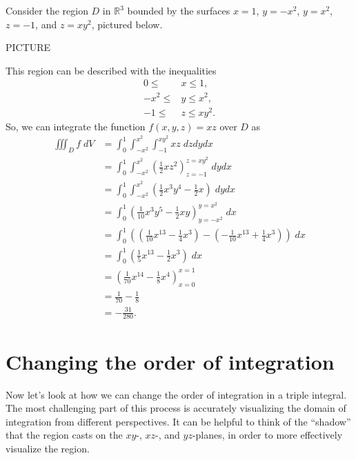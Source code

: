 \documentclass{ximera}
\begin{document}
\begin{example}
Consider the region $D$ in $\mathbb{R}^3$ bounded by the surfaces $x=1$, $y=-x^2$, $y=x^2$, $z = -1$, and $z=xy^2$, pictured below.

PICTURE

This region can be described with the inequalities
\begin{align*}
0\leq &x\leq 1,\\
-x^2\leq &y\leq x^2,\\
-1\leq &z\leq xy^2.
\end{align*}
So, we can integrate the function $f(x,y,z) = xz$ over $D$ as
\begin{align*}
\iiint_D f\;dV &= \int_0^1\int_{-x^2}^{x^2}\int_{-1}^{xy^2} xz\;dzdydx\\
&= \int_0^1\int_{-x^2}^{x^2}\left(\frac{1}{2}xz^2\right)_{z = -1}^{z = xy^2}\;dydx\\
&= \int_0^1\int_{-x^2}^{x^2}\left(\frac{1}{2}x^3y^4-\frac{1}{2}x\right)\;dydx\\
&= \int_0^1 \left(\frac{1}{10}x^3y^5 - \frac{1}{2}xy\right)_{y=-x^2}^{y=x^2}\;dx\\
&= \int_0^1 \left(\left(\frac{1}{10}x^{13} - \frac{1}{4}x^3\right) - \left(-\frac{1}{10}x^{13} + \frac{1}{4}x^3\right)\right)\;dx\\
&= \int_0^1\left(\frac{1}{5}x^{13} - \frac{1}{2}x^3\right)\;dx\\
&= \left(\frac{1}{70}x^{14} - \frac{1}{8}x^4\right)_{x = 0}^{x=1}\\
&= \frac{1}{70} - \frac{1}{8}\\
&= -\frac{31}{280}.
\end{align*}
\end{example}

\section*{Changing the order of integration}

Now let's look at how we can change the order of integration in a triple integral. The most challenging part of this process is accurately visualizing the domain of integration from different perspectives. It can be helpful to think of the ``shadow'' that the region casts on the $xy$-, $xz$-, and $yz$-planes, in order to more effectively visualize the region.
\end{document}
